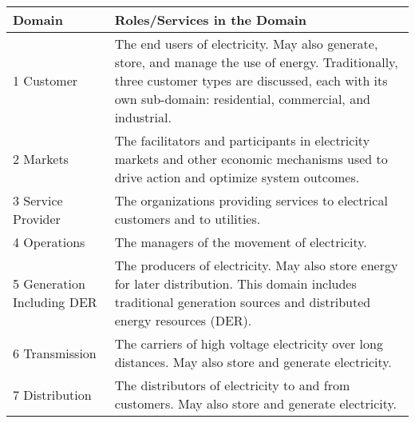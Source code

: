 
\begin{tabular}{|p{}|p{}|}
    \hline
    \textbf{Domain} & \textbf{Roles/Services in the Domain} \\
    \hline
    1 Customer & The end users of electricity. May also generate, store, and manage the use of energy. Traditionally, three customer types are discussed, each with its own sub-domain: residential, commercial, and industrial. \\
    \hline
    2 Markets & The facilitators and participants in electricity markets and other economic mechanisms used to drive action and optimize system outcomes. \\
    \hline
    3 Service Provider & The organizations providing services to electrical customers and to utilities. \\
    \hline
    4 Operations & The managers of the movement of electricity. \\
    \hline
    5 Generation Including DER & The producers of electricity. May also store energy for later distribution. This domain includes traditional generation sources and distributed energy resources (DER). \\
    \hline
    6 Transmission & The carriers of high voltage electricity over long distances. May also store and generate electricity. \\
    \hline
    7 Distribution & The distributors of electricity to and from customers. May also store and generate electricity. \\
    \hline
    \end{tabular}